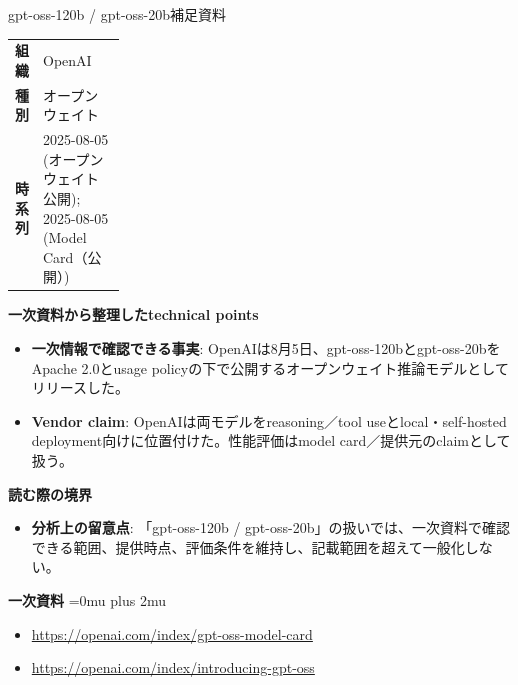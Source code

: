 \begin{technicalnote}{gpt-oss-120b / gpt-oss-20b}{補足資料}
\begingroup
\begin{tabularx}{\linewidth}{@{}>{\bfseries}p{0.22\linewidth}X@{}}
組織 & OpenAI \\
種別 & オープンウェイト \\
時系列 & 2025-08-05 (オープンウェイト公開); 2025-08-05 (Model Card（公開）) \\
\end{tabularx}
\smallskip
{\bfseries 一次資料から整理したtechnical points}
\begin{itemize}[leftmargin=1.5em,itemsep=0.35em]
\item \textbf{一次情報で確認できる事実}: OpenAIは8月5日、gpt-oss-120bとgpt-oss-20bをApache 2.0とusage policyの下で公開するオープンウェイト推論モデルとしてリリースした。
\item \textbf{Vendor claim}: OpenAIは両モデルをreasoning／tool useとlocal・self-hosted deployment向けに位置付けた。性能評価はmodel card／提供元のclaimとして扱う。
\end{itemize}
\begin{minipage}{\linewidth}
{\bfseries 読む際の境界}
\begin{itemize}[leftmargin=1.5em,itemsep=0.35em]
\item \textbf{分析上の留意点}: 「gpt-oss-120b / gpt-oss-20b」の扱いでは、一次資料で確認できる範囲、提供時点、評価条件を維持し、記載範囲を超えて一般化しない。
\end{itemize}
\begin{samepage}
{\bfseries 一次資料}
\begingroup\sloppy
\Urlmuskip=0mu plus 2mu\relax
\begin{itemize}[leftmargin=1.5em,itemsep=0.25em]
\item {\scriptsize\url{https://openai.com/index/gpt-oss-model-card}}
\item {\scriptsize\url{https://openai.com/index/introducing-gpt-oss}}
\end{itemize}
\endgroup
\end{samepage}
\end{minipage}
\endgroup
\end{technicalnote}
\medskip

